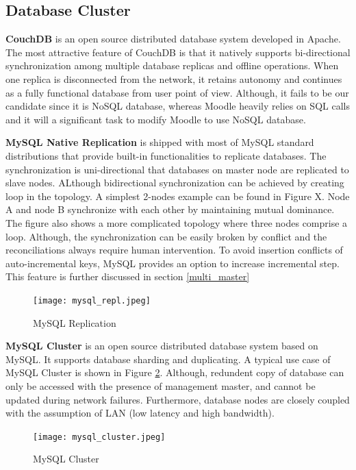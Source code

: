 \subsection{Database Cluster} \label{db_cluster}
\textbf{CouchDB}\cite{couchdb} is an open source distributed database system developed in Apache. The most attractive feature of CouchDB is that it natively supports bi-directional synchronization among multiple database replicas and offline operations. When one replica is disconnected from the network, it retains autonomy and continues as a fully functional database from user point of view. Although, it fails to be our candidate since it is NoSQL database, whereas Moodle heavily relies on SQL calls and it will a significant task to modify Moodle to use NoSQL database.

\textbf{MySQL Native Replication} is shipped with most of MySQL standard distributions that provide built-in functionalities to replicate databases. The synchronization is uni-directional that databases on master node are replicated to slave nodes. ALthough bidirectional synchronization can be achieved by creating loop in the topology. A simplest 2-nodes example can be found in Figure X. Node A and node B synchronize with each other by maintaining mutual dominance. The figure also shows a more complicated topology where three nodes comprise a loop. Although, the synchronization can be easily broken by conflict and the reconciliations always require human intervention.
To avoid insertion conflicts of auto-incremental keys, MySQL provides an option to increase incremental step. This feature is further discussed in section \ref{multi_master}

\begin{figure}[htbp]
\centering
\texttt{[image: mysql\_repl.jpeg]}
\caption{MySQL Replication}
\label{mysql_repl}
\end{figure}

\textbf{MySQL Cluster}\cite{mysqlcluster} is an open source distributed database system based on MySQL. It supports database sharding and duplicating. A typical use case of MySQL Cluster is shown in Figure \ref{mysql_cluster}. Although, redundent copy of database can only be accessed with the presence of management master, and cannot be updated during network failures. Furthermore, database nodes are closely coupled with the assumption of LAN (low latency and high bandwidth).

\begin{figure}[htbp]
\centering
\texttt{[image: mysql\_cluster.jpeg]}
\caption{MySQL Cluster}
\label{mysql_cluster}
\end{figure}

